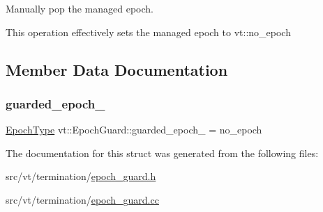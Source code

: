 Manually pop the managed epoch. 

This operation effectively sets the managed epoch to vt\+::no\+\_\+epoch 

\subsection{Member Data Documentation}
\mbox{\label{structvt_1_1_epoch_guard_aecd3303d5b5594b0f19791a472ce515c}} 
\subsubsection{\texorpdfstring{guarded\+\_\+epoch\+\_\+}{guarded\_epoch\_}}
{\footnotesize\ttfamily \hyperlink{namespacevt_a81d11b28122d43bf9834577e4a06440f}{Epoch\+Type} vt\+::\+Epoch\+Guard\+::guarded\+\_\+epoch\+\_\+ = no\+\_\+epoch\hspace{0.3cm}{\ttfamily [private]}}



The documentation for this struct was generated from the following files\+:\begin{DoxyCompactItemize}
\item 
src/vt/termination/\hyperlink{epoch__guard_8h}{epoch\+\_\+guard.\+h}\item 
src/vt/termination/\hyperlink{epoch__guard_8cc}{epoch\+\_\+guard.\+cc}\end{DoxyCompactItemize}
